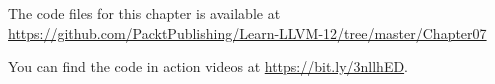 The code files for this chapter is available at  \url{https://github.com/PacktPublishing/Learn-LLVM-12/tree/master/Chapter07}\par

You can find the code in action videos at \url{https://bit.ly/3nllhED}.\par